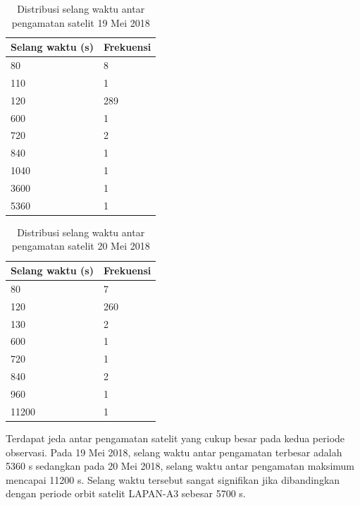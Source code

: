 \begin{table}[!ht]
\begin{center}
\caption{Distribusi selang waktu antar pengamatan satelit 19 Mei 2018}
\label{table:time19}
\begin{tabular}{|l|l|}
\hline
Selang waktu (s) & Frekuensi \\ \hline
80               & 8         \\ \hline
110              & 1         \\ \hline
120              & 289       \\ \hline
600              & 1         \\ \hline
720              & 2         \\ \hline
840              & 1         \\ \hline
1040             & 1         \\ \hline
3600             & 1         \\ \hline
5360             & 1         \\ \hline
\end{tabular}
\end{center}
\vspace{-5mm}
\end{table}

\begin{table}[!ht]
\begin{center}
\caption{Distribusi selang waktu antar pengamatan satelit 20 Mei 2018}
\label{table:time20}
\begin{tabular}{|l|l|}
\hline
Selang waktu (s) & Frekuensi \\ \hline
80               & 7         \\ \hline
120              & 260       \\ \hline
130              & 2         \\ \hline
600              & 1         \\ \hline
720              & 1         \\ \hline
840              & 2         \\ \hline
960              & 1         \\ \hline
11200            & 1         \\ \hline
\end{tabular}
\end{center}
\vspace{-5mm}
\end{table}

Terdapat jeda antar pengamatan satelit yang cukup besar pada kedua periode
observasi. Pada 19 Mei 2018, selang waktu antar pengamatan terbesar adalah 5360
s sedangkan pada 20 Mei 2018, selang waktu antar pengamatan maksimum mencapai
11200 s. Selang waktu tersebut sangat signifikan jika dibandingkan dengan
periode orbit satelit LAPAN-A3 sebesar 5700 s. 

